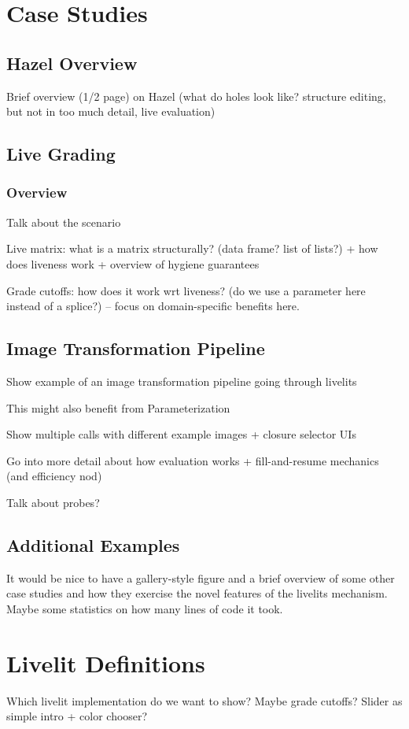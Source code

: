 \section{Case Studies}
\subsection{Hazel Overview}
Brief overview (1/2 page) on Hazel (what do holes look like? structure editing, but not in too much detail,
live evaluation)

\subsection{Live Grading}
\subsubsection{Overview}
Talk about the scenario

Live matrix: what is a matrix structurally? (data frame? list of lists?) + how does liveness work
+ overview of hygiene guarantees

Grade cutoffs: how does it work wrt liveness? (do we use a parameter here instead of a splice?) -- 
focus on domain-specific benefits here.

\subsection{Image Transformation Pipeline}
Show example of an image transformation pipeline going through livelits

This might also benefit from Parameterization

Show multiple calls with different example images + closure selector UIs

Go into more detail about how evaluation works + fill-and-resume mechanics (and efficiency nod)

Talk about probes?

\subsection{Additional Examples}
It would be nice to have a gallery-style figure and a brief overview of some other case studies
and how they exercise the novel features of the livelits mechanism. Maybe some statistics on how
many lines of code it took.

\section{Livelit Definitions}
Which livelit implementation do we want to show? Maybe grade cutoffs? Slider as simple intro + color chooser?

